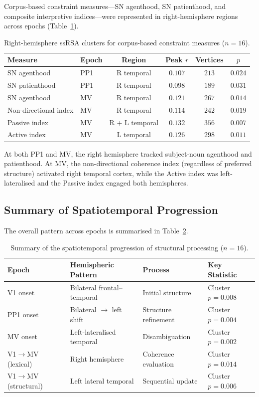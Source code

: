 \documentclass[11pt]{article}
\begin{document}
Corpus-based constraint measures---SN agenthood, SN patienthood, and composite interpretive indices---were represented in right-hemisphere regions across epochs (Table~\ref{tab:neural_rh}).

\begin{table}[H]
\centering
\caption{Right-hemisphere ssRSA clusters for corpus-based constraint measures ($n = 16$).}
\label{tab:neural_rh}
\begin{tabular}{llcccc}
\toprule
Measure & Epoch & Region & Peak $r$ & Vertices & $p$ \\
\midrule
SN agenthood & PP1 & R temporal & $0.107$ & $213$ & $0.024$ \\
SN patienthood & PP1 & R temporal & $0.098$ & $189$ & $0.031$ \\
SN agenthood & MV & R temporal & $0.121$ & $267$ & $0.014$ \\
Non-directional index & MV & R temporal & $0.114$ & $242$ & $0.019$ \\
Passive index & MV & R + L temporal & $0.132$ & $356$ & $0.007$ \\
Active index & MV & L temporal & $0.126$ & $298$ & $0.011$ \\
\bottomrule
\end{tabular}
\end{table}

At both PP1 and MV, the right hemisphere tracked subject-noun agenthood and patienthood. At MV, the non-directional coherence index (regardless of preferred structure) activated right temporal cortex, while the Active index was left-lateralised and the Passive index engaged both hemispheres.

\subsection{Summary of Spatiotemporal Progression}

The overall pattern across epochs is summarised in Table~\ref{tab:summary_pattern}.

\begin{table}[H]
\centering
\caption{Summary of the spatiotemporal progression of structural processing ($n = 16$).}
\label{tab:summary_pattern}
\begin{tabular}{llll}
\toprule
Epoch & Hemispheric Pattern & Process & Key Statistic \\
\midrule
V1 onset & Bilateral frontal--temporal & Initial structure & Cluster $p = 0.008$ \\
PP1 onset & Bilateral $\to$ left shift & Structure refinement & Cluster $p = 0.004$ \\
MV onset & Left-lateralised temporal & Disambiguation & Cluster $p = 0.002$ \\
V1$\to$MV (lexical) & Right hemisphere & Coherence evaluation & Cluster $p = 0.014$ \\
V1$\to$MV (structural) & Left lateral temporal & Sequential update & Cluster $p = 0.006$ \\
\bottomrule
\end{tabular}
\end{table}
\end{document}
